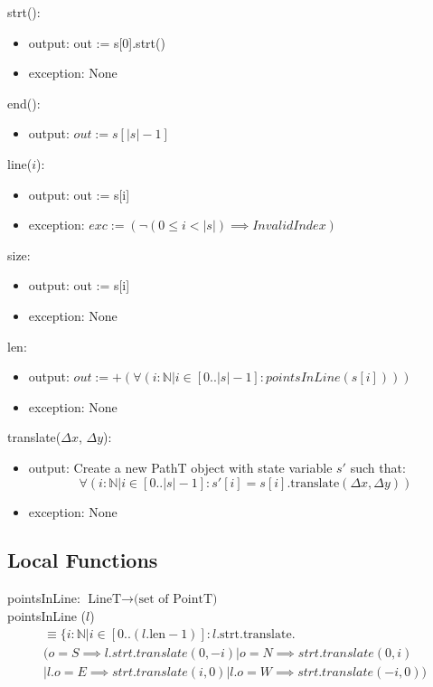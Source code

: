 \documentclass[12pt]{article}
\begin{document}
\noindent strt():
\begin{itemize}
\item output: out := s[0].strt()
\item exception: None
\end{itemize}

\noindent end():
\begin{itemize}
\item output: $out := s[|s| - 1]$
\end{itemize}

\noindent line($i$):
\begin{itemize}
\item output: out := s[i]
\item exception: $exc := (\neg (0 \leq i < |s|) \implies InvalidIndex)$
\end{itemize}

\noindent size:
\begin{itemize}
\item output: out := s[i]
\item exception: None
\end{itemize}

\noindent len:
\begin{itemize}
\item output: $out := +(\forall(i : \mathbb{N} | i \in [0..|s|-1]: pointsInLine(s[i])))$
\item exception: None
\end{itemize}

\noindent translate($\Delta x$, $\Delta y$):
\begin{itemize}
\item output: Create a new PathT object with state variable $s'$ such that:
$$\forall(i: \mathbb{N} | i \in [0..|s|-1] : s'[i] = s[i].\mbox{translate}(\Delta x, \Delta y))$$
\item exception: None
\end{itemize}

\subsection*{Local Functions}

pointsInLine: $\mbox{LineT} \rightarrow \mbox{(set of PointT)}$\\

\noindent pointsInLine ($l$) 
\begin{multline*}
\equiv \{ i: \mathbb{N} | i \in [0
  .. (l.\mbox{len} - 1)] : l.\mbox{strt}.\mbox{translate}.\\
( o = S \implies l.strt.translate(0, -i)|o = N \implies strt.translate(0, i) \\
| l.o = E \implies strt.translate(i, 0)| l.o = W \implies strt.translate(-i, 0))
\end{multline*} 
\end{document}
